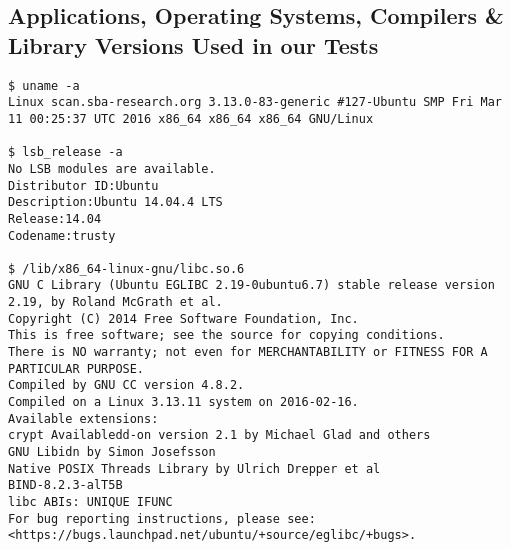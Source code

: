 \begin{appendices}
%
%
%
%
%

\section{Applications, Operating Systems, Compilers \& Library Versions Used in our Tests} \label{app:vers}


\begin{verbatim}
$ uname -a
Linux scan.sba-research.org 3.13.0-83-generic #127-Ubuntu SMP Fri Mar 11 00:25:37 UTC 2016 x86_64 x86_64 x86_64 GNU/Linux

$ lsb_release -a
No LSB modules are available.
Distributor ID:Ubuntu
Description:Ubuntu 14.04.4 LTS
Release:14.04
Codename:trusty

$ /lib/x86_64-linux-gnu/libc.so.6
GNU C Library (Ubuntu EGLIBC 2.19-0ubuntu6.7) stable release version 2.19, by Roland McGrath et al.
Copyright (C) 2014 Free Software Foundation, Inc.
This is free software; see the source for copying conditions.
There is NO warranty; not even for MERCHANTABILITY or FITNESS FOR A
PARTICULAR PURPOSE.
Compiled by GNU CC version 4.8.2.
Compiled on a Linux 3.13.11 system on 2016-02-16.
Available extensions:
crypt Availabledd-on version 2.1 by Michael Glad and others
GNU Libidn by Simon Josefsson
Native POSIX Threads Library by Ulrich Drepper et al
BIND-8.2.3-alT5B
libc ABIs: UNIQUE IFUNC
For bug reporting instructions, please see:
<https://bugs.launchpad.net/ubuntu/+source/eglibc/+bugs>.


\end{verbatim}
\end{appendices}
